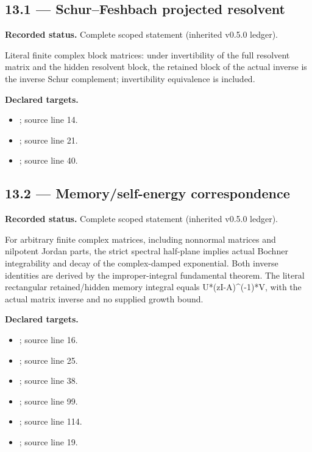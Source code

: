 \subsection{13.1 — Schur--Feshbach projected resolvent}
\label{result:13.1}
\textbf{Recorded status.} Complete scoped statement (inherited v0.5.0 ledger).\par
Literal finite complex block matrices: under invertibility of the full resolvent matrix and the hidden resolvent block, the retained block of the actual inverse is the inverse Schur complement; invertibility equivalence is included.

\textbf{Declared targets.}\begin{itemize}
\item {}; source line 14.
\item {}; source line 21.
\item {}; source line 40.
\end{itemize}
\subsection{13.2 — Memory/self-energy correspondence}
\label{result:13.2}
\textbf{Recorded status.} Complete scoped statement (inherited v0.5.0 ledger).\par
For arbitrary finite complex matrices, including nonnormal matrices and nilpotent Jordan parts, the strict spectral half-plane implies actual Bochner integrability and decay of the complex-damped exponential. Both inverse identities are derived by the improper-integral fundamental theorem. The literal rectangular retained/hidden memory integral equals U*(zI-A)\textasciicircum{}(-1)*V, with the actual matrix inverse and no supplied growth bound.

\textbf{Declared targets.}\begin{itemize}
\item {}; source line 16.
\item {}; source line 25.
\item {}; source line 38.
\item {}; source line 99.
\item {}; source line 114.
\item {}; source line 19.
\end{itemize}
